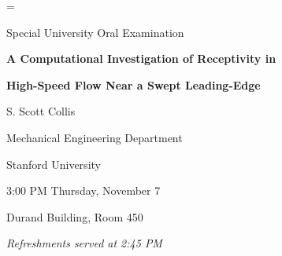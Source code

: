 \magnification=
\nopagenumbers

\centerline{Special University Oral Examination}

\bigskip

\centerline{\bf A Computational Investigation of Receptivity in}
\centerline{\bf High-Speed Flow Near a Swept Leading-Edge}

\bigskip

\centerline{S. Scott Collis}
\centerline{Mechanical Engineering Department}
\centerline{Stanford University}

\bigskip

\centerline{3:00 PM Thursday, November 7}
\centerline{Durand Building, Room 450}
\smallskip
\centerline{\it Refreshments served at 2:45 PM}

\bigskip
\bigskip


